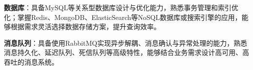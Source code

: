 \item \textbf{数据库}：具备MySQL等关系型数据库设计与优化能力，熟悉事务管理和索引优化；掌握Redis、MongoDB、ElasticSearch等NoSQL数据库或搜索引擎的应用，能够根据需求灵活选择数据存储方案，提升查询效率。
\item \textbf{消息队列}：具备使用RabbitMQ实现异步解耦、消息确认与异常处理的能力，熟悉消息持久化、延迟队列、死信队列等高级特性，能够结合业务需求设计高可用、高吞吐的消息系统。